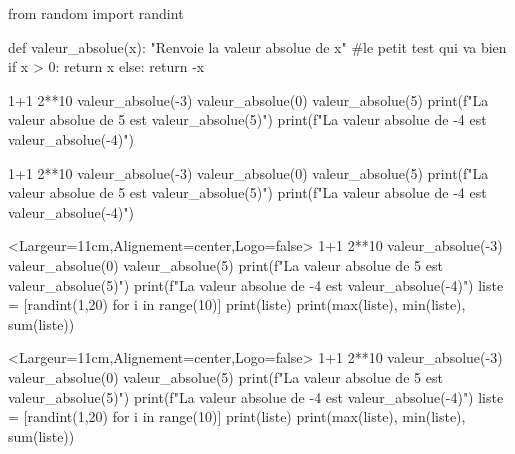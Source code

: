 \documentclass[french,a4paper,10pt]{article}
\begin{document}
\begin{python}
from random import randint

def valeur_absolue(x):
	"Renvoie la valeur absolue de x"
	#le petit test qui va bien
	if x > 0:
		return x
	else:
		return -x
\end{python}

{\small \begin{codehigh}
\begin{ConsolePiton}{}
1+1
2**10
valeur_absolue(-3)
valeur_absolue(0)
valeur_absolue(5)
print(f"La valeur absolue de 5 est {valeur_absolue(5)}")
print(f"La valeur absolue de -4 est {valeur_absolue(-4)}")
\end{ConsolePiton}
\end{codehigh}}

\begin{ConsolePiton}{}
1+1
2**10
valeur_absolue(-3)
valeur_absolue(0)
valeur_absolue(5)
print(f"La valeur absolue de 5 est {valeur_absolue(5)}")
print(f"La valeur absolue de -4 est {valeur_absolue(-4)}")
\end{ConsolePiton}

\pagebreak

{\small \begin{codehigh}
\begin{ConsolePiton}<Largeur=11cm,Alignement=center,Logo=false>{}
1+1
2**10
valeur_absolue(-3)
valeur_absolue(0)
valeur_absolue(5)
print(f"La valeur absolue de 5 est {valeur_absolue(5)}")
print(f"La valeur absolue de -4 est {valeur_absolue(-4)}")
liste = [randint(1,20) for i in range(10)]
print(liste)
print(max(liste), min(liste), sum(liste))
\end{ConsolePiton}
\end{codehigh}}

\begin{ConsolePiton}<Largeur=11cm,Alignement=center,Logo=false>{}
1+1
2**10
valeur_absolue(-3)
valeur_absolue(0)
valeur_absolue(5)
print(f"La valeur absolue de 5 est {valeur_absolue(5)}")
print(f"La valeur absolue de -4 est {valeur_absolue(-4)}")
liste = [randint(1,20) for i in range(10)]
print(liste)
print(max(liste), min(liste), sum(liste))
\end{ConsolePiton}
\end{document}
